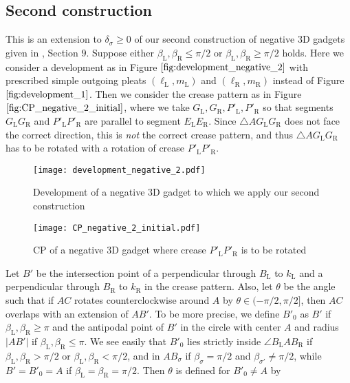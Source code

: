 \documentclass[11pt]{amsart}
\numberwithin{equation}{section}
\numberwithin{theorem}{section}
\newcommand{\Lt}{\ensuremath{\mathrm{L}}}
\newcommand{\Rt}{\ensuremath{\mathrm{R}}}
\newcommand{\norm}[1]{\ensuremath{\left| #1 \right|}}
\begin{document}
\subsection{Second construction}\label{subsec:negative_new_2}
This is an extension to $\delta_\sigma\geqslant 0$ of our second construction of negative $3$D gadgets given in \cite{Doi19}, Section $9$.
Suppose either $\beta_\Lt ,\beta_\Rt\leqslant\pi /2$ or $\beta_\Lt ,\beta_\Rt\geqslant\pi /2$ holds. 
Here we consider a development as in Figure $\ref{fig:development_negative_2}$ with prescribed simple outgoing pleats
$(\ell_\Lt ,m_\Lt )$ and $(\ell_\Rt ,m_\Rt )$ instead of Figure $\ref{fig:development_1}$.
Then we consider the crease pattern as in Figure $\ref{fig:CP_negative_2_initial}$,
where we take $G_\Lt ,G_\Rt ,P'_\Lt ,P'_\Rt$ so that segments $G_\Lt G_\Rt$ and $P'_\Lt P'_\Rt$ are parallel to segment $E_\Lt E_\Rt$.
Since $\triangle AG_\Lt G_\Rt$ does not face the correct direction,
this is \emph{not} the correct crease pattern, and thus $\triangle AG_\Lt G_\Rt$ has to be rotated with a rotation of crease $P'_\Lt P'_\Rt$.
\begin{figure}[htbp]
\addtocounter{theorem}{1}
\centering\texttt{[image: development\_negative\_2.pdf]}
    \caption{Development of a negative $3$D gadget to which we apply our second construction}
    \label{fig:development_negative_2}
\end{figure}
\begin{figure}[htbp]
\addtocounter{theorem}{1}
\centering\texttt{[image: CP\_negative\_2\_initial.pdf]}
    \caption{CP of a negative $3$D gadget where crease $P'_\Lt P'_\Rt$ is to be rotated}
    \label{fig:CP_negative_2_initial}
\end{figure}
Let $B'$ be the intersection point of a perpendicular through $B_\Lt$ to $k_\Lt$ and a perpendicular through $B_\Rt$ to $k_\Rt$ in the crease pattern.
Also, let $\theta$ be the angle such that if $AC$ rotates counterclockwise around $A$ by $\theta\in (-\pi/2 ,\pi /2]$,
then $AC$ overlaps with an extension of $AB'$.
To be more precise, we define $B'_0$ as $B'$ if $\beta_\Lt ,\beta_\Rt\geqslant\pi$
and the antipodal point of $B'$ in the circle with center $A$ and radius $\norm{AB'}$ if $\beta_\Lt ,\beta_\Rt\leqslant\pi$.
We see easily that $B'_0$ lies strictly inside $\angle B_\Lt AB_\Rt$ if $\beta_\Lt ,\beta_\Rt >\pi /2$ or $\beta_\Lt ,\beta_\Rt <\pi /2$,
and in $AB_\sigma$ if $\beta_\sigma =\pi /2$ and $\beta_{\sigma'}\neq\pi /2$, while $B'=B'_0=A$ if $\beta_\Lt =\beta_\Rt =\pi /2$.
Then $\theta$ is defined for $B'_0\neq A$ by
\end{document}
